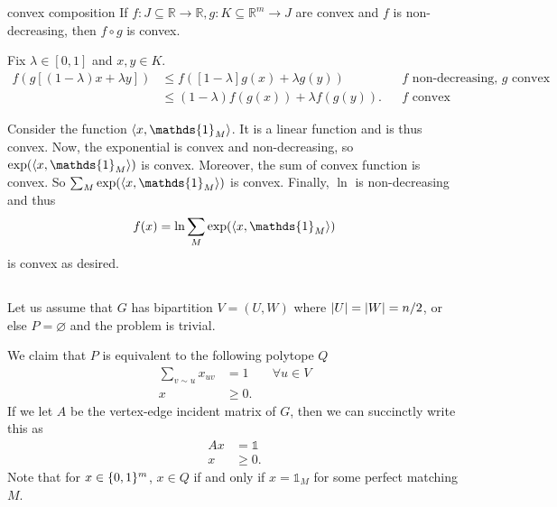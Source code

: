 \documentclass[10pt]{article}
\DeclarePairedDelimiter{\set}{\lbrace}{\rbrace}
\DeclarePairedDelimiter{\iprod}{\langle}{\rangle}
\DeclarePairedDelimiter{\card}{\lvert}{\rvert}
\newcommand{\ones}{\mathds{1}}
\newcommand{\R}{\mathbb{R}}
\newcommand{\sset}{\subseteq}
\begin{document}
\clearpage
\section{}
\subsection{}
\begin{lem}{}{convex composition}
  If $f: J\sset \R\to \R, g: K\sset \R^m\to J$ are convex and $f$ is non-decreasing,
  then $f\circ g$ is convex.
\end{lem}

\begin{pf}{}{}
  Fix $\lambda\in [0, 1]$ and $x, y\in K$.
  \begin{align*}
    f(g[(1-\lambda)x + \lambda y])
    &\leq f([1-\lambda]g(x) + \lambda g(y)) &&\text{$f$ non-decreasing, $g$ convex} \\
    &\leq (1-\lambda) f(g(x)) + \lambda f(g(y)). &&\text{$f$ convex}
  \end{align*}
\end{pf}

Consider the function $\iprod{x, \ones_M}$.
It is a linear function and is thus convex.
Now,
the exponential is convex and non-decreasing,
so $\exp(\iprod{x, \ones_M})$ is convex.
Moreover,
the sum of convex function is convex.
So $\sum_M \exp(\iprod{x, \ones_M})$ is convex.
Finally,
$\ln$ is non-decreasing and thus
\[
  f(x) = \ln \sum_M \exp(\iprod{x, \ones_M})
\]
is convex as desired.

\subsection{}
Let us assume that $G$ has bipartition $V=(U, W)$
where $\card U = \card W = n/2$,
or else $P = \varnothing$ and the problem is trivial.

We claim that $P$ is equivalent to the following polytope $Q$
\begin{align*}
  \sum_{v\sim u} x_{uv} &= 1 &&\forall u\in V \\
  x &\geq 0.
\end{align*}
If we let $A$ be the vertex-edge incident matrix of $G$,
then we can succinctly write this as
\begin{align*}
  Ax &= \ones \\
  x &\geq 0.
\end{align*}
Note that for $x\in \set{0, 1}^m$,
$x\in Q$ if and only if $x = \ones_M$ for some perfect matching $M$.
\end{document}
